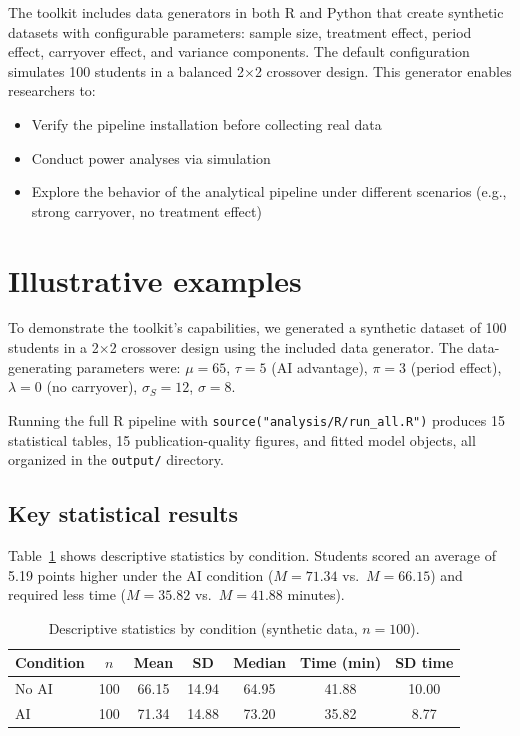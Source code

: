 \documentclass[authoryear,preprint,review,12pt]{elsarticle}
\begin{document}
The toolkit includes data generators in both R and Python that create
synthetic datasets with configurable parameters: sample size, treatment
effect, period effect, carryover effect, and variance components. The
default configuration simulates 100 students in a balanced 2$\times$2
crossover design. This generator enables researchers to:
\begin{itemize}
    \item Verify the pipeline installation before collecting real data
    \item Conduct power analyses via simulation
    \item Explore the behavior of the analytical pipeline under different
    scenarios (e.g., strong carryover, no treatment effect)
\end{itemize}

\section{Illustrative examples}
\label{sec:examples}

To demonstrate the toolkit's capabilities, we generated a synthetic dataset
of 100 students in a 2$\times$2 crossover design using the included data
generator. The data-generating parameters were: $\mu = 65$, $\tau = 5$
(AI advantage), $\pi = 3$ (period effect), $\lambda = 0$ (no carryover),
$\sigma_S = 12$, $\sigma = 8$.

Running the full R pipeline with \texttt{source("analysis/R/run\_all.R")}
produces 15 statistical tables, 15 publication-quality figures, and fitted
model objects, all organized in the \texttt{output/} directory.

\subsection{Key statistical results}

Table~\ref{tab:descriptive} shows descriptive statistics by condition.
Students scored an average of 5.19 points higher under the AI condition
($M = 71.34$ vs.\ $M = 66.15$) and required less time ($M = 35.82$ vs.\
$M = 41.88$ minutes).

\begin{table}[htbp]
\centering
\caption{Descriptive statistics by condition (synthetic data, $n = 100$).}
\label{tab:descriptive}
\begin{tabular}{lcccccc}
\toprule
\textbf{Condition} & $n$ & \textbf{Mean} & \textbf{SD} & \textbf{Median} & \textbf{Time (min)} & \textbf{SD time} \\
\midrule
No AI & 100 & 66.15 & 14.94 & 64.95 & 41.88 & 10.00 \\
AI    & 100 & 71.34 & 14.88 & 73.20 & 35.82 &  8.77 \\
\bottomrule
\end{tabular}
\end{table}
\end{document}
